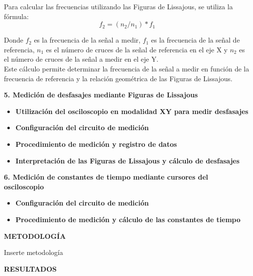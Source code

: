 \documentclass[12pt]{article}
\begin{document}
\begin{itemize}
		Para calcular las frecuencias utilizando las Figuras de Lissajous, se utiliza la fórmula: $$f_{2} = (n_{2}/n_{1}) * f_{1}$$
		
		Donde $f_{2}$ es la frecuencia de la señal a medir, $f_{1}$ es la frecuencia de la señal de referencia, $n_{1}$ es el número de cruces de la señal de referencia en el eje X y $n_{2}$ es el número de cruces de la señal a medir en el eje Y.\\
		
		Este cálculo permite determinar la frecuencia de la señal a medir en función de la frecuencia de referencia y la relación geométrica de las Figuras de Lissajous.
		
	\end{itemize}

	
	\textbf{5. Medición de desfasajes mediante Figuras de Lissajous}\\
	
	\begin{itemize}
		\item \textbf{Utilización del osciloscopio en modalidad XY para medir desfasajes}
		\item \textbf{Configuración del circuito de medición}
		\item \textbf{Procedimiento de medición y registro de datos}
		\item \textbf{Interpretación de las Figuras de Lissajous y cálculo de desfasajes}
	\end{itemize}

	
	\textbf{6. Medición de constantes de tiempo mediante cursores del osciloscopio}\\
	
	\begin{itemize}
	
		\item \textbf{Configuración del circuito de medición}
		\item \textbf{Procedimiento de medición y cálculo de las constantes de tiempo}
		
	\end{itemize}
	

	\newpage
	
	\begin{center}
		\textbf{\large METODOLOGÍA}\\
	\end{center}
	
	Inserte metodología
	
	\newpage
	
	\begin{center}
		\textbf{\large RESULTADOS}\\
	\end{center}
	
\end{document}
